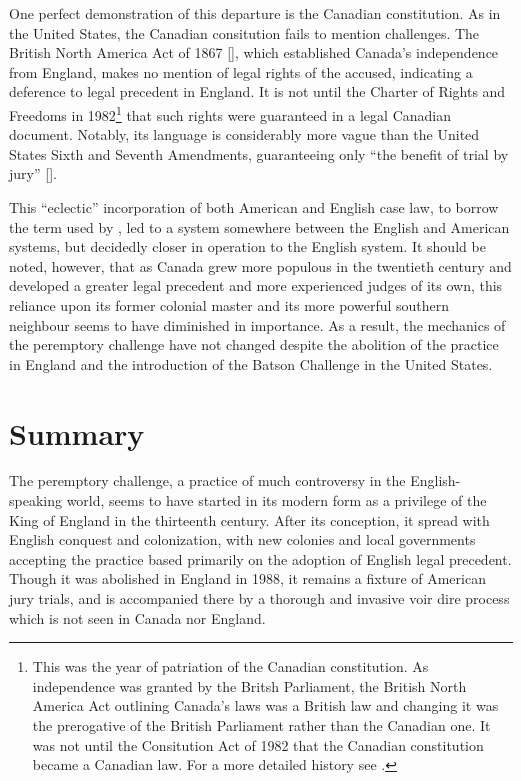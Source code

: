 One perfect demonstration of this departure is the Canadian constitution. As in the United States, the Canadian consitution fails
to mention challenges. The British North America Act of 1867 [\cite{canadaconst}], which established Canada's independence from
England, makes no mention of legal rights of the accused, indicating a deference to legal precedent in England. It is not until
the Charter of Rights and Freedoms in 1982\footnote{This was the year of patriation of the Canadian constitution. As
  independence was granted by the Britsh Parliament, the British North America Act outlining Canada's laws was a British law and
  changing it was the prerogative of the British Parliament rather than the Canadian one. It was not until the Consitution Act of
  1982 that the Canadian constitution became a Canadian law. For a more detailed history see \cite{sheppard2018}.} that such
rights were guaranteed in a legal Canadian document. Notably, its language is considerably more vague than the United States Sixth
and Seventh Amendments, guaranteeing only ``the benefit of trial by jury'' [\cite{canadaconst}].

This ``eclectic'' incorporation of both American and English case law, to borrow the term used by \cite{brown2000}, led to a
system somewhere between the English and American systems, but decidedly closer in operation to the English system. It should be
noted, however, that as Canada grew more populous in the twentieth century and developed a greater legal precedent and more
experienced judges of its own, this reliance upon its former colonial master and its more powerful southern neighbour seems to
have diminished in importance. As a result, the mechanics of the peremptory challenge have not changed despite the abolition of
the practice in England and the introduction of the Batson Challenge in the United States.

\section{Summary}

The peremptory challenge, a practice of much controversy in the English-speaking world, seems to have started in its modern form
as a privilege of the King of England in the thirteenth century. After its conception, it spread with English conquest and
colonization, with new colonies and local governments accepting the practice based primarily on the adoption of English legal
precedent. Though it was abolished in England in 1988, it remains a fixture of American jury trials, and is accompanied there by
a thorough and invasive voir dire process which is not seen in Canada nor England.

